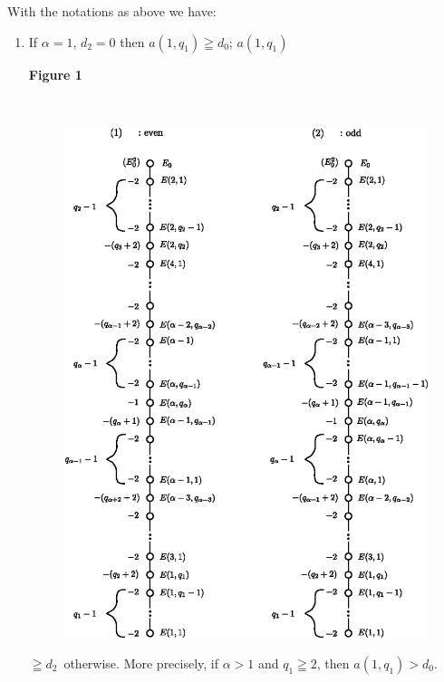 \subsubsection{}\label{chap2:1.4.1}
\begin{lemma*}
  With the notations as above we have:
  \begin{enumerate}
    \renewcommand{\labelenumi}{\rm(\theenumi)}
  \item If $\alpha=1$, \iec $d_{2}=0$ then $a(1,q_{1})\geqq d_{0}$;
    $a(1,q_{1})$
    
    \medskip
    \centerline{\bf Figure 1}\pageoriginale\
    \begin{figure}[H]
      \centering
      \includegraphics[scale=.9]{figures/chap2.add-fig1.eps}
    \end{figure}
    $\geqq d_{2}$\pageoriginale\ otherwise. More precisely, if $\alpha>1$
    and $q_{1}\geqq 2$, then $a(1,q_{1})>d_{0}$.
    

\end{enumerate}
\end{lemma*}
